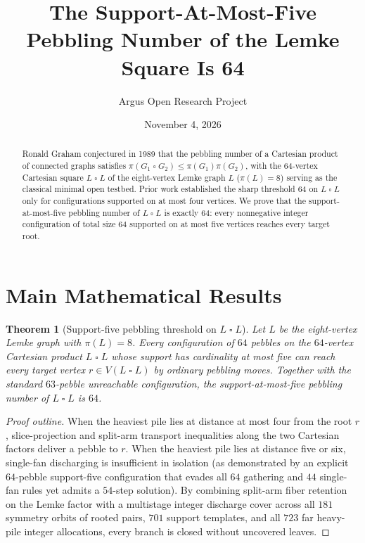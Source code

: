\documentclass[10pt,reqno]{amsart}
\title[Support-Five Pebbling on the Lemke Square]
{The Support-At-Most-Five Pebbling Number of the Lemke Square Is 64}
\author{Argus Open Research Project}
\date{November 4, 2026}
\newtheorem{theorem}{Theorem}[section]
\theoremstyle{definition}
\begin{document}
\begin{abstract}
Ronald Graham conjectured in 1989 that the pebbling number of a Cartesian product of connected graphs satisfies $\pi(G_1 \mathbin{\square} G_2) \le \pi(G_1)\pi(G_2)$, with the $64$-vertex Cartesian square $L \mathbin{\square} L$ of the eight-vertex Lemke graph $L$ ($\pi(L)=8$) serving as the classical minimal open testbed. Prior work established the sharp threshold $64$ on $L \mathbin{\square} L$ only for configurations supported on at most four vertices. We prove that the support-at-most-five pebbling number of $L \mathbin{\square} L$ is exactly $64$: every nonnegative integer configuration of total size $64$ supported on at most five vertices reaches every target root.
\end{abstract}
\maketitle

\section{Main Mathematical Results}
\begin{theorem}[Support-five pebbling threshold on $L \mathbin{\square} L$]
Let $L$ be the eight-vertex Lemke graph with $\pi(L)=8$. Every configuration of $64$ pebbles on the $64$-vertex Cartesian product $L \mathbin{\square} L$ whose support has cardinality at most five can reach every target vertex $r \in V(L \mathbin{\square} L)$ by ordinary pebbling moves. Together with the standard $63$-pebble unreachable configuration, the support-at-most-five pebbling number of $L \mathbin{\square} L$ is $64$.
\end{theorem}
\begin{proof}[Proof outline]
When the heaviest pile lies at distance at most four from the root $r$, slice-projection and split-arm transport inequalities along the two Cartesian factors deliver a pebble to $r$. When the heaviest pile lies at distance five or six, single-fan discharging is insufficient in isolation (as demonstrated by an explicit $64$-pebble support-five configuration that evades all $64$ gathering and $44$ single-fan rules yet admits a $54$-step solution). By combining split-arm fiber retention on the Lemke factor with a multistage integer discharge cover across all $181$ symmetry orbits of rooted pairs, $701$ support templates, and all $723$ far heavy-pile integer allocations, every branch is closed without uncovered leaves.
\end{proof}
\end{document}
